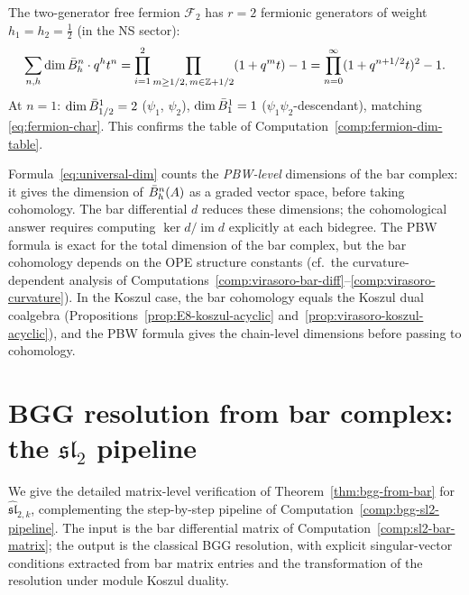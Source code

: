 \begin{computation}
\label{comp:verify-fermion}
The two-generator free fermion $\mathcal{F}_2$ has $r = 2$ fermionic
generators of weight $h_1 = h_2 = \tfrac{1}{2}$ (in the NS sector):
\[
\sum_{n,h} \dim \bar{B}^n_h \cdot q^h t^n
= \prod_{i=1}^{2} \prod_{m \geq 1/2,\, m \in \mathbb{Z} + 1/2}
  (1 + q^m t) - 1
= \prod_{n=0}^{\infty} (1 + q^{n+1/2} t)^2 - 1.
\]
At $n = 1$: $\dim \bar{B}^1_{1/2} = 2$ ($\psi_1$, $\psi_2$),
$\dim \bar{B}^1_1 = 1$ ($\psi_1 \psi_2$-descendant), matching
\eqref{eq:fermion-char}.
This confirms the table of Computation~\ref{comp:fermion-dim-table}.
\end{computation}

\begin{remark}\label{rem:PBW-approximation}
Formula~\eqref{eq:universal-dim} counts the
\emph{PBW-level} dimensions of the bar complex: it gives
the dimension of $\bar{B}^n_h(A)$ as a graded vector space, before
taking cohomology.  The bar differential $d$ reduces these
dimensions; the cohomological answer requires computing
$\ker d / \operatorname{im} d$ explicitly at each bidegree.
The PBW formula is exact for the total dimension of the bar complex,
but the bar cohomology depends on the OPE structure constants
(cf.\ the curvature-dependent analysis of
Computations~\ref{comp:virasoro-bar-diff}--\ref{comp:virasoro-curvature}).
In the Koszul case, the bar cohomology equals the Koszul dual
coalgebra (Propositions~\ref{prop:E8-koszul-acyclic}
and~\ref{prop:virasoro-koszul-acyclic}), and the PBW formula gives
the chain-level dimensions before passing to cohomology.
\end{remark}


\section{BGG resolution from bar complex: the
\texorpdfstring{$\mathfrak{sl}_2$}{sl-2} pipeline}
\label{sec:bgg-sl2-pipeline}

We give the detailed matrix-level verification of
Theorem~\ref{thm:bgg-from-bar} for
$\widehat{\mathfrak{sl}}_{2,k}$, complementing the
step-by-step pipeline of
Computation~\ref{comp:bgg-sl2-pipeline}.  The input is
the bar differential matrix of
Computation~\ref{comp:sl2-bar-matrix}; the output is
the classical BGG resolution, with explicit singular-vector
conditions extracted from bar matrix entries and the
transformation of the resolution under module Koszul duality.

